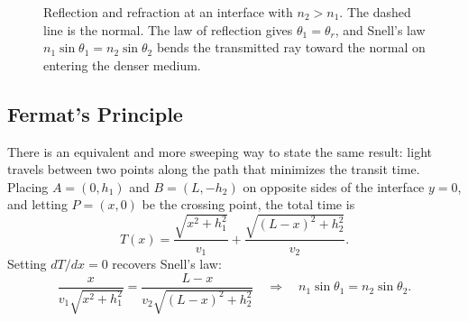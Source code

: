 \begin{figure}[H]
\centering
{}
\caption{Reflection and refraction at an interface with $n_2 > n_1$. The dashed line is the normal. The law of reflection gives $\theta_1 = \theta_r$, and Snell's law $n_1\sin\theta_1 = n_2\sin\theta_2$ bends the transmitted ray toward the normal on entering the denser medium.}
\label{fig:snell}
\end{figure}

\subsection{Fermat's Principle}
\label{sec:fermat}
There is an equivalent and more sweeping way to state the same result: light travels between two points along the path that minimizes the transit time. Placing $A = (0, h_1)$ and $B = (L, -h_2)$ on opposite sides of the interface $y = 0$, and letting $P = (x, 0)$ be the crossing point, the total time is
\begin{equation}
    T(x) = \frac{\sqrt{x^2 + h_1^2}}{v_1} + \frac{\sqrt{(L-x)^2 + h_2^2}}{v_2}.
\end{equation}
Setting $dT/dx = 0$ recovers Snell's law:
\begin{equation}
    \frac{x}{v_1\sqrt{x^2 + h_1^2}} = \frac{L - x}{v_2\sqrt{(L-x)^2 + h_2^2}}
    \quad\Longrightarrow\quad
    n_1\sin\theta_1 = n_2\sin\theta_2.
\end{equation}

